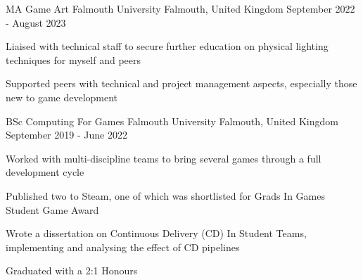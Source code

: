 \begin{cventries}
  \cventry
  {MA Game Art}
  {Falmouth University}
  {Falmouth, United Kingdom}
  {September 2022 - August 2023}
  {
    \begin{cvitems}
      \item Liaised with technical staff to secure further education on physical lighting techniques for myself and peers
      \item Supported peers with technical and project management aspects, especially those new to game development
    \end{cvitems}
  }

  \cventry
    {BSc Computing For Games} %
    {Falmouth University} %
    {Falmouth, United Kingdom} %
    {September 2019 - June 2022} %
    {
      \begin{cvitems} %
        \item Worked with multi-discipline teams to bring several games through a full development cycle
        \item Published two to Steam, one of which was shortlisted for Grads In Games Student Game Award
        \item Wrote a dissertation on Continuous Delivery (CD) In Student Teams, implementing and analysing the effect of CD pipelines
        \item Graduated with a 2:1 Honours
      \end{cvitems}
    }
\end{cventries}